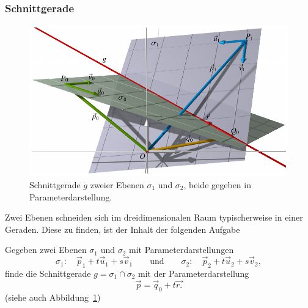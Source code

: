 \subsubsection{Schnittgerade}
\begin{figure}
\centering
\includegraphics{3/images/schnittgerade.pdf}
\caption{Schnittgerade $g$ zweier Ebenen $\sigma_1$ und $\sigma_2$, beide
gegeben in Parameterdarstellung.
\label{skript:affin:schnittgerade}}
\end{figure}
Zwei Ebenen schneiden sich im dreidimensionalen Raum typischerweise in 
einer Geraden.
Diese zu finden, ist der Inhalt der folgenden Aufgabe

\begin{aufgabe}
\label{skript:affin:aufgabe:schnittgerade}
Gegeben zwei Ebenen $\sigma_1$ und $\sigma_2$ mit Parameterdarstellungen
\begin{equation}
\sigma_1:\quad
\vec{p}_1+t\vec{u}_1+s\vec{v}_1
\qquad\text{und}\qquad
\sigma_2:\quad
\vec{p}_2+t\vec{u}_2+s\vec{v}_2,
\label{skript:affin:aufgabe:schnittgerade:gleichungen}
\end{equation}
finde die Schnittgerade $g=\sigma_1\cap\sigma_2$ mit der Parameterdarstellung
\[
\vec{p}
=
\vec{q}_0
+
t\vec{r.}
\]
(siehe auch Abbildung~\ref{skript:affin:schnittgerade})
\end{aufgabe}

